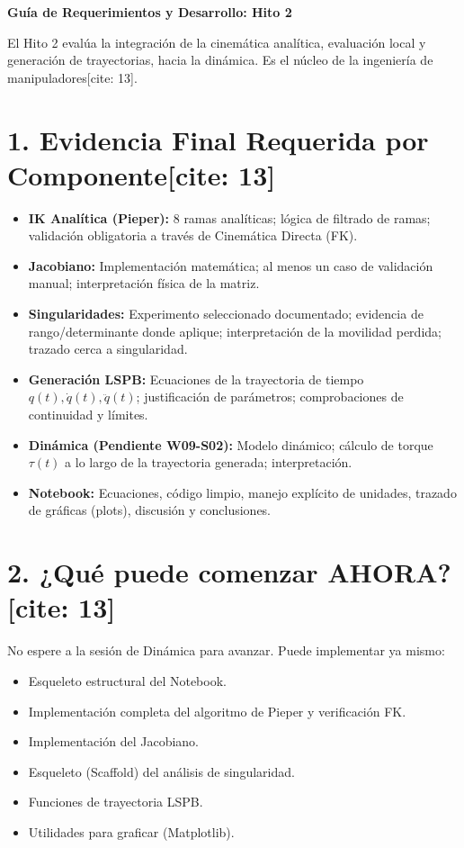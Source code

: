\documentclass[11pt, a4paper]{article}
\begin{document}
\begin{center}
    \Large\textbf{\textcolor{ucbblue}{Guía de Requerimientos y Desarrollo: Hito 2}}\\[0.2cm]
\end{center}

\begin{tcolorbox}[colback=yellow!10, colframe=black, title=\textbf{Declaración de Arquitectura de Evaluación}]
    El Hito 2 evalúa la integración de la cinemática analítica, evaluación local y generación de trayectorias, hacia la dinámica. Es el núcleo de la ingeniería de manipuladores[cite: 13].
\end{tcolorbox}

\section*{1. Evidencia Final Requerida por Componente[cite: 13]}
\begin{itemize}
    \item \textbf{IK Analítica (Pieper):} 8 ramas analíticas; lógica de filtrado de ramas; validación obligatoria a través de Cinemática Directa (FK).
    \item \textbf{Jacobiano:} Implementación matemática; al menos un caso de validación manual; interpretación física de la matriz.
    \item \textbf{Singularidades:} Experimento seleccionado documentado; evidencia de rango/determinante donde aplique; interpretación de la movilidad perdida; trazado cerca a singularidad.
    \item \textbf{Generación LSPB:} Ecuaciones de la trayectoria de tiempo $q(t), \dot{q}(t), \ddot{q}(t)$; justificación de parámetros; comprobaciones de continuidad y límites.
    \item \textbf{Dinámica (Pendiente W09-S02):} Modelo dinámico; cálculo de torque $\tau(t)$ a lo largo de la trayectoria generada; interpretación.
    \item \textbf{Notebook:} Ecuaciones, código limpio, manejo explícito de unidades, trazado de gráficas (plots), discusión y conclusiones.
\end{itemize}

\section*{2. ¿Qué puede comenzar AHORA?[cite: 13]}
No espere a la sesión de Dinámica para avanzar. Puede implementar ya mismo:
\begin{itemize}
    \item Esqueleto estructural del Notebook.
    \item Implementación completa del algoritmo de Pieper y verificación FK.
    \item Implementación del Jacobiano.
    \item Esqueleto (Scaffold) del análisis de singularidad.
    \item Funciones de trayectoria LSPB.
    \item Utilidades para graficar (Matplotlib).
\end{itemize}
\end{document}
